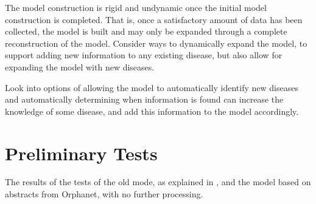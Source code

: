 \documentclass[10pt,letterpaper,final]{article}
\begin{document}
The model construction is rigid and undynamic once the initial model
construction is completed. That is, once a satisfactory amount of data
has been collected, the model is built and may only be expanded through
a complete reconstruction of the model. Consider ways to dynamically
expand the model, to support adding new information to any existing
disease, but also allow for expanding the model with new diseases.

Look into options of allowing the model to automatically identify new
diseases and automatically determining when information is found can
increase the knowledge of some disease, and add this information to the
model accordingly.


\renewcommand\bibname{References}



\newpage
\appendix
\section{Preliminary Tests}
\label{app:preliminary_results}

The results of the tests of the old mode, as explained in
\cite{jensenandersen}, and the model based on abstracts from Orphanet,
with no further processing.


\end{document}
